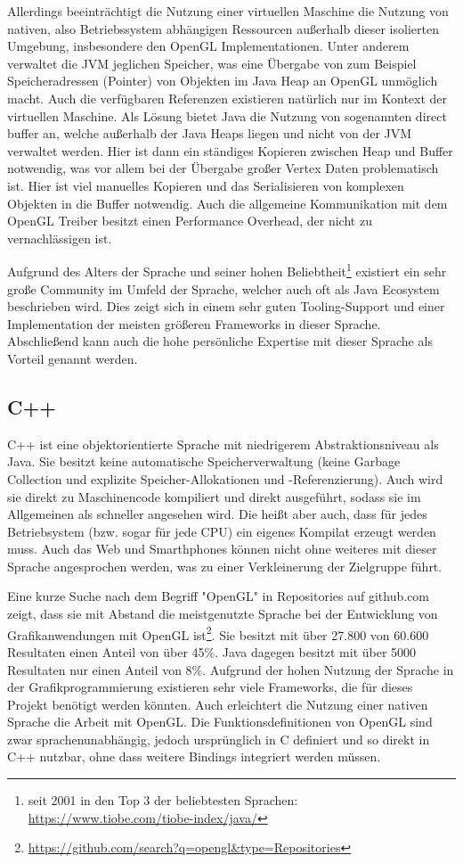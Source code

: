 Allerdings beeinträchtigt die Nutzung einer virtuellen Maschine die Nutzung von nativen, also Betriebssystem abhängigen Ressourcen außerhalb dieser isolierten Umgebung, insbesondere den OpenGL Implementationen. Unter anderem verwaltet die JVM jeglichen Speicher, was eine Übergabe von zum Beispiel Speicheradressen (Pointer) von Objekten im Java Heap an OpenGL unmöglich macht. Auch die verfügbaren Referenzen existieren natürlich nur im Kontext der virtuellen Maschine. Als Lösung bietet Java die Nutzung von sogenannten direct buffer an, welche außerhalb der Java Heaps liegen und nicht von der JVM verwaltet werden. Hier ist dann ein ständiges Kopieren zwischen Heap und Buffer notwendig, was vor allem bei der Übergabe großer Vertex Daten problematisch ist. Hier ist viel manuelles Kopieren und das Serialisieren von komplexen Objekten in die Buffer notwendig. Auch die allgemeine Kommunikation mit dem OpenGL Treiber besitzt einen Performance Overhead, der nicht zu vernachlässigen ist.

Aufgrund des Alters der Sprache und seiner hohen Beliebtheit\footnote{seit 2001 in den Top 3 der beliebtesten Sprachen: \url{https://www.tiobe.com/tiobe-index/java/}} existiert ein sehr große Community im Umfeld der Sprache, welcher auch oft als Java Ecosystem beschrieben wird. Dies zeigt sich in einem sehr guten Tooling-Support und einer Implementation der meisten größeren Frameworks in dieser Sprache. Abschließend kann auch die hohe persönliche Expertise mit dieser Sprache als Vorteil genannt werden.

\subsection{C++}
C++ ist eine objektorientierte Sprache mit niedrigerem Abstraktionsniveau als Java. Sie besitzt keine automatische Speicherverwaltung (keine Garbage Collection und explizite Speicher-Allokationen und -Referenzierung). Auch wird sie direkt zu Maschinencode kompiliert und direkt ausgeführt, sodass sie im Allgemeinen als schneller angesehen wird. Die heißt aber auch, dass für jedes Betriebsystem (bzw. sogar für jede CPU) ein eigenes Kompilat erzeugt werden muss. Auch das Web und Smarthphones können nicht ohne weiteres mit dieser Sprache angesprochen werden, was zu einer Verkleinerung der Zielgruppe führt.

Eine kurze Suche nach dem Begriff "OpenGL" in Repositories auf github.com zeigt, dass sie mit Abstand die meistgenutzte Sprache bei der Entwicklung von Grafikanwendungen mit OpenGL ist\footnote{\url{https://github.com/search?q=opengl&type=Repositories}}. Sie besitzt mit über 27.800 von 60.600 Resultaten einen Anteil von über 45\%. Java dagegen besitzt mit über 5000 Resultaten nur einen Anteil von 8\%. Aufgrund der hohen Nutzung der Sprache in der Grafikprogrammierung existieren sehr viele Frameworks, die für dieses Projekt benötigt werden könnten. Auch erleichtert die Nutzung einer nativen Sprache die Arbeit mit OpenGL. Die Funktionsdefinitionen von OpenGL sind zwar sprachenunabhängig, jedoch ursprünglich in C definiert und so direkt in C++ nutzbar, ohne dass weitere Bindings integriert werden müssen.

